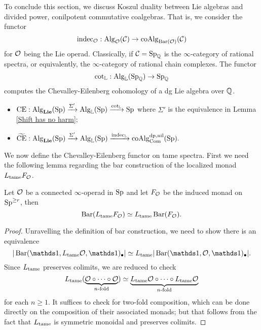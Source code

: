 To conclude this section,
we discuss Koszul duality between Lie algebras and divided power, conilpotent commutative coalgebras.
That is, we consider the functor
$$\operatorname{indec}_{{\mathcal{O}}}: \operatorname{Alg}_{{\mathcal{O}}}({\mathcal{C}})\to \operatorname{coAlg}_{\operatorname{Bar}({\mathcal{O}})}({\mathcal{C}})$$
for ${\mathcal{O}}$ being the Lie operad. 
Classically, if ${\mathcal{C}} = \operatorname{Sp}_{{\mathbb{Q}}}$ is the $\infty$-category of rational spectra, or equivalently, the $\infty$-category of rational chain complexes.
The functor 
$$
\cot_{{\mathbb{L}}}: \operatorname{Alg}_{{\mathbb{L}}}(\operatorname{Sp}_{{\mathbb{Q}}}) 
\to 
\operatorname{Sp}_{{\mathbb{Q}}}
$$
computes the Chevalley-Eilenberg cohomology of a dg Lie algebra over ${\mathbb{Q}}$. 

\begin{definition}
\label{CChevalley-Eilenberg functor}
    \begin{itemize}

        We define two versions of the \emph{Chevalley-Eilenberg} functor on $\Sp$:
        \item  
        $
        \operatorname{CE}: \operatorname{Alg}_{\mathbf{Lie}}(\operatorname{Sp})\xrightarrow{\Sigma'} \operatorname{Alg}_{{\mathbb{L}}}(\operatorname{Sp})
        \xrightarrow{\cot_{{\mathbb{L}}}}
        \operatorname{Sp}
        $
        where $\Sigma'$ is the equivalence in Lemma \ref{Shift has no harm};
        \item $
        \widetilde{\operatorname{CE}}: \operatorname{Alg}_{\mathbf{Lie}}(\operatorname{Sp})\xrightarrow{\Sigma'} \operatorname{Alg}_{{\mathbb{L}}}(\operatorname{Sp})
        \xrightarrow{\operatorname{indec}_{{\mathbb{L}}}}
        \operatorname{coAlg}^{\operatorname{dp}, \operatorname{nil}}_{\operatorname{Com}}(\operatorname{Sp}).
        $
    \end{itemize}
\end{definition}

We now define the Chevalley-Eilenberg functor on
tame spectra. First we need the following lemma regarding the bar construction of the localized monad $L_{\operatorname{\operatorname{tame}}}F_{{\mathcal{O}}}$.
\begin{lemma}
    Let ${\mathcal{O}}$ be a connected $\infty$-operad in $ \Sp$ and let $F_{{\mathcal{O}}}$ be the induced monad on $\operatorname{Sp}^{\geq r}$,
    then 
    $$
    \operatorname{Bar}(L_{\operatorname{\operatorname{tame}}}F_{\mathcal{O}} ) \simeq L_{\operatorname{\operatorname{tame}}} \operatorname{Bar}(F_{\mathcal{O}}).
    $$
\end{lemma}
\begin{proof}
    Unravelling the definition of bar construction, we need to show there is an equivalence
    $$
     |\Barconstruction(\triv, L_{\tame}\CO , \triv)_{\bullet}|
     \simeq
     L_{\tame}|\Barconstruction(\triv, \CO , \triv)_{\bullet}|.
    $$
    Since $L_{\operatorname{\operatorname{tame}}}$ preserves colimits, we are reduced to check
    $$
    L_{\operatorname{\operatorname{tame}}} (\underbrace{{\mathcal{O}} \circ \cdots \circ {\mathcal{O}}}_{\text{$n$-fold}} )
    \simeq 
    \underbrace{ L_{\operatorname{\operatorname{tame}}}{\mathcal{O}} \circ \cdots \circ  L_{\operatorname{\operatorname{tame}}}{\mathcal{O}}}_{\text{$n$-fold}} 
    $$
    for each $n\geq 1$.
    It suffices to check for two-fold composition, which can be done directly on the composition of their associated monads; but that follows from the fact that $L_{\operatorname{\operatorname{tame}}}$ is symmetric monoidal and preserves colimits.
\end{proof}

